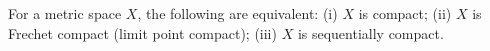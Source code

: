 For a metric space $X$, the following are equivalent:
(i) $X$ is compact;
(ii) $X$ is Frechet compact (limit point compact);
(iii) $X$ is sequentially compact.